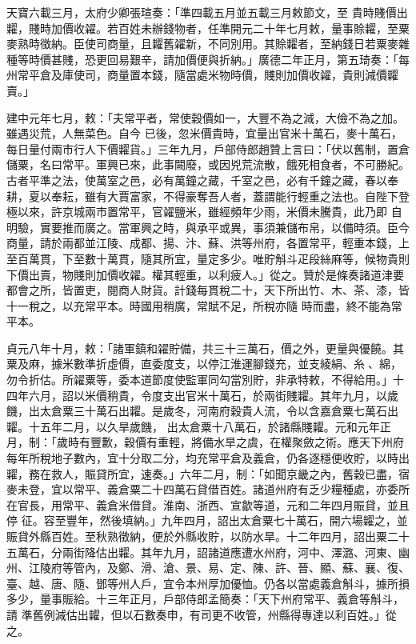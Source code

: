 \begin{pinyinscope}
 天寶六載三月，太府少卿張瑄奏：「準四載五月並五載三月敕節文，至
 貴時賤價出糶，賤時加價收糴。若百姓未辦錢物者，任準開元二十年七月敕，量事賒糶，至粟麥熟時徵納。臣使司商量，且糶舊糴新，不同別用。其賒糶者，至納錢日若粟麥雜種等時價甚賤，恐更回易艱辛，請加價便與折納。」廣德二年正月，第五琦奏：「每州常平倉及庫使司，商量置本錢，隨當處米物時價，賤則加價收糴，貴則減價糶賣。」



 建中元年七月，敕：「夫常平者，常使穀價如一，大豐不為之減，大儉不為之加。雖遇災荒，人無菜色。自今
 已後，忽米價貴時，宜量出官米十萬石，麥十萬石，每日量付兩市行人下價糶貨。」三年九月，戶部侍郎趙贊上言曰：「伏以舊制，置倉儲粟，名曰常平。軍興已來，此事闕廢，或因兇荒流散，餓死相食者，不可勝紀。古者平準之法，使萬室之邑，必有萬鐘之藏，千室之邑，必有千鐘之藏，春以奉耕，夏以奉耘，雖有大賈富家，不得豪奪吾人者，蓋謂能行輕重之法也。自陛下登極以來，許京城兩市置常平，官糴鹽米，雖經頻年少雨，米價未騰貴，此乃即
 自明驗，實要推而廣之。當軍興之時，與承平或異，事須兼儲布帛，以備時須。臣今商量，請於兩都並江陵、成都、揚、汴、蘇、洪等州府，各置常平，輕重本錢，上至百萬貫，下至數十萬貫，隨其所宜，量定多少。唯貯斛斗疋段絲麻等，候物貴則下價出賣，物賤則加價收糴。權其輕重，以利疲人。」從之。贊於是條奏諸道津要都會之所，皆置吏，閱商人財貨。計錢每貫稅二十，天下所出竹、木、茶、漆，皆十一稅之，以充常平本。時國用稍廣，常賦不足，所稅亦隨
 時而盡，終不能為常平本。



 貞元八年十月，敕：「諸軍鎮和糴貯備，共三十三萬石，價之外，更量與優饒。其粟及麻，據米數準折虛價，直委度支，以停江淮運腳錢充，並支綾絹、糸、綿，勿令折估。所糴粟等，委本道節度使監軍同勾當別貯，非承特敕，不得給用。」十四年六月，詔以米價稍貴，令度支出官米十萬石，於兩街賤糶。其年九月，以歲饑，出太倉粟三十萬石出糶。是歲冬，河南府穀貴人流，令以含嘉倉粟七萬石出糶。十五年二月，以久旱歲饑，
 出太倉粟十八萬石，於諸縣賤糶。元和元年正月，制：「歲時有豐歉，穀價有重輕，將備水旱之虞，在權聚斂之術。應天下州府每年所稅地子數內，宜十分取二分，均充常平倉及義倉，仍各逐穩便收貯，以時出糶，務在救人，賑貸所宜，速奏。」六年二月，制：「如聞京畿之內，舊穀已盡，宿麥未登，宜以常平、義倉粟二十四萬石貸借百姓。諸道州府有乏少糧種處，亦委所在官長，用常平、義倉米借貸。淮南、浙西、宣歙等道，元和二年四月賑貸，並且停
 征。容至豐年，然後填納。」九年四月，詔出太倉粟七十萬石，開六場糶之，並賑貸外縣百姓。至秋熟徵納，便於外縣收貯，以防水旱。十二年四月，詔出粟二十五萬石，分兩街降估出糶。其年九月，詔諸道應遭水州府，河中、澤潞、河東、幽州、江陵府等管內，及鄭、滑、滄、景、易、定、陳、許、晉、顯、蘇、襄、復、臺、越、唐、隨、鄧等州人戶，宜令本州厚加優恤。仍各以當處義倉斛斗，據所損多少，量事賑給。十三年正月，戶部侍郎孟簡奏：「天下州府常平、義倉等斛斗，請
 準舊例減估出糶，但以石數奏申，有司更不收管，州縣得專達以利百姓。」從之。




\end{pinyinscope}
